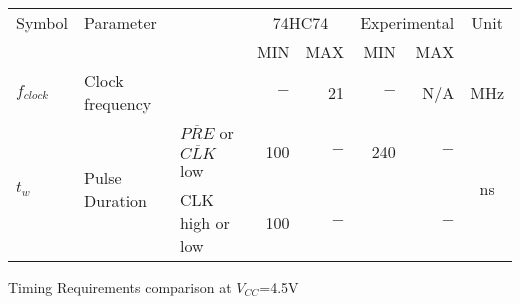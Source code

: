 \begin{tabular}{|l|l|l|r|r|r|r|c|}
    \toprule
    Symbol  &\multicolumn{2}{|l|}{Parameter}&\multicolumn{2}{|c|}{74HC74}&\multicolumn{2}{|c|}{Experimental}&Unit\\
            &\multicolumn{2}{c|}{ }&MIN&MAX&MIN&MAX&\\
    \midrule
    $f_{clock}$&Clock frequency&    &$-$&21&$-$&N/A&MHz\\
    \hline
    \multirow{2}{*}{$t_{w}$}&\multirow{2}{*}{Pulse Duration}& $\overline{PRE}$ or $\overline{CLK}$ low&100&$-$&240&$-$  &\multirow{4}{*}{ns}\\
        &&CLK high or low&100&$-$&  &$-$  &\\
    \bottomrule
\end{tabular}
\caption{Timing Requirements comparison at $V_{CC}$=4.5V}
